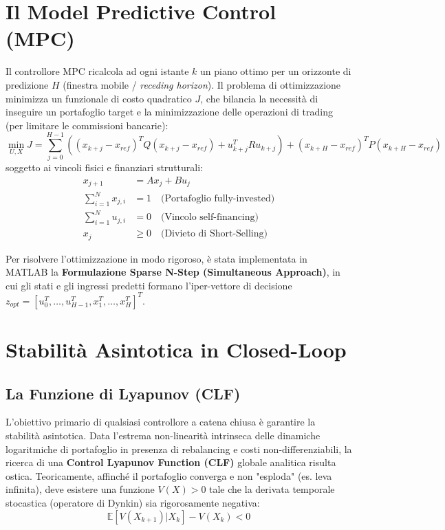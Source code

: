 \section{Il Model Predictive Control (MPC)}
Il controllore MPC ricalcola ad ogni istante $k$ un piano ottimo per un orizzonte di predizione $H$ (finestra mobile / \textit{receding horizon}). Il problema di ottimizzazione minimizza un funzionale di costo quadratico $J$, che bilancia la necessità di inseguire un portafoglio target e la minimizzazione delle operazioni di trading (per limitare le commissioni bancarie):
\begin{equation}
    \min_{U, X} J = \sum_{j=0}^{H-1} \left( (x_{k+j} - x_{ref})^T Q (x_{k+j} - x_{ref}) + u_{k+j}^T R u_{k+j} \right) + (x_{k+H} - x_{ref})^T P (x_{k+H} - x_{ref})
\end{equation}
soggetto ai vincoli fisici e finanziari strutturali:
\begin{align}
    x_{j+1} &= A x_j + B u_j \\
    \sum_{i=1}^N x_{j,i} &= 1 \quad \text{(Portafoglio fully-invested)} \\
    \sum_{i=1}^N u_{j,i} &= 0 \quad \text{(Vincolo self-financing)} \\
    x_{j} &\geq 0 \quad \text{(Divieto di Short-Selling)}
\end{align}

Per risolvere l'ottimizzazione in modo rigoroso, è stata implementata in MATLAB la \textbf{Formulazione Sparse N-Step (Simultaneous Approach)}, in cui gli stati e gli ingressi predetti formano l'iper-vettore di decisione $z_{opt} = [u_0^T, \dots, u_{H-1}^T, x_1^T, \dots, x_H^T]^T$.

\section{Stabilità Asintotica in Closed-Loop}
\subsection{La Funzione di Lyapunov (CLF)}
L'obiettivo primario di qualsiasi controllore a catena chiusa è garantire la stabilità asintotica. Data l'estrema non-linearità intrinseca delle dinamiche logaritmiche di portafoglio in presenza di rebalancing e costi non-differenziabili, la ricerca di una \textbf{Control Lyapunov Function (CLF)} globale analitica risulta ostica.
Teoricamente, affinché il portafoglio converga e non "esploda" (es. leva infinita), deve esistere una funzione $V(X) > 0$ tale che la derivata temporale stocastica (operatore di Dynkin) sia rigorosamente negativa:
\begin{equation}
    \mathbb{E}[V(X_{k+1}) | X_k] - V(X_k) < 0
\end{equation}

